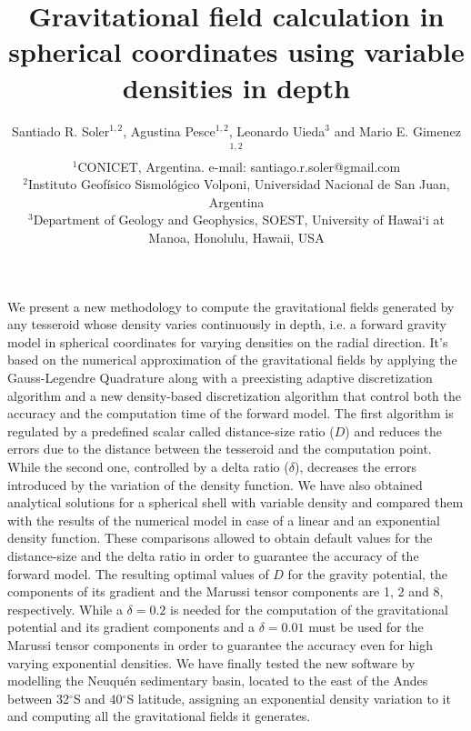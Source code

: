 \documentclass[extra]{gji}
\begin{document}
\title[Variable Density Tesseroids]{
    Gravitational field calculation in spherical coordinates using variable 
    densities in depth
}
\author[S.R. Soler, A. Pesce, L. Uieda and M.E. Gimenez]{
    Santiado R. Soler$^{1,2}$, Agustina Pesce$^{1,2}$, Leonardo Uieda$^3$ and
    Mario E. Gimenez$^{1,2}$ \\
    $^1$CONICET, Argentina. e-mail: santiago.r.soler@gmail.com\\
    $^2$Instituto Geofísico Sismológico Volponi, Universidad Nacional de
    San Juan, Argentina\\
    $^3$Department of Geology and Geophysics, SOEST, University of Hawai‘i at
    Manoa, Honolulu, Hawaii, USA
    }


\maketitle

\begin{summary}
We present a new methodology to compute the gravitational fields generated by 
any tesseroid whose density varies continuously in depth, i.e. a forward 
gravity model in spherical coordinates for varying densities on the radial 
direction.
It's based on the numerical approximation of the gravitational fields by 
applying the Gauss-Legendre Quadrature along with a preexisting adaptive 
discretization algorithm and a new density-based discretization algorithm that 
control both the accuracy and the computation time of the forward model.
The first algorithm is regulated by a predefined scalar called distance-size 
ratio ($D$) and reduces the errors due to the distance between the tesseroid 
and the computation point.
While the second one, controlled by a delta ratio ($\delta$), decreases the 
errors introduced by the variation of the density function.
We have also obtained analytical solutions for a spherical shell with variable 
density and compared them with the results of the numerical model in case of a 
linear and an exponential density function.
These comparisons allowed to obtain default values for the distance-size and 
the delta ratio in order to guarantee the accuracy of the forward model.
The resulting optimal values of $D$ for the gravity potential, the components 
of its gradient and the Marussi tensor components are 1, 2 and 8, 
respectively.
While a $\delta=0.2$ is needed for the computation of the gravitational 
potential and its gradient components and a $\delta=0.01$ must be used for 
the Marussi tensor components in order to guarantee the accuracy even for high 
varying exponential densities.
We have finally tested the new software by modelling the Neuqu\'en sedimentary 
basin, located to the east of the Andes between 32$^\circ$S and 40$^\circ$S 
latitude, assigning an exponential density variation to it and computing all 
the gravitational fields it generates.
\end{summary}
\end{document}
